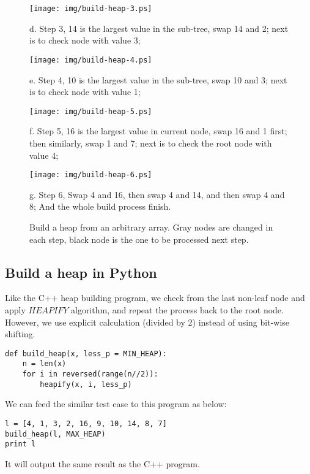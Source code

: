 \documentclass{article}
\begin{document}
\begin{figure}[htbp]
  \begin{center}
    \texttt{[image: img/build-heap-3.ps]}

    d. Step 3, 14 is the largest value in the sub-tree, swap 14 and 2; next is to check
node with value 3;

    \texttt{[image: img/build-heap-4.ps]}

    e. Step 4, 10 is the largest value in the sub-tree, swap 10 and 3; next is to check
node with value 1;

    \texttt{[image: img/build-heap-5.ps]}

    f. Step 5, 16 is the largest value in current node, swap 16 and 1 first; then
similarly, swap 1 and 7; next is to check the root node with value 4;

    \texttt{[image: img/build-heap-6.ps]}

    g. Step 6, Swap 4 and 16, then swap 4 and 14, and then swap 4 and 8; 
And the whole build process finish.

    \caption{Build a heap from an arbitrary array. Gray nodes are changed in each step,
black node is the one to be processed next step.} \label{fig:build-heap-2}
  \end{center}
\end{figure}


\subsection*{Build a heap in Python}

Like the C++ heap building program, we check from the last non-leaf
node and apply $HEAPIFY$ algorithm, and repeat the process back to
the root node. However, we use explicit calculation (divided by 2)
instead of using bit-wise shifting.

\lstset{language=Python}
\begin{lstlisting}
def build_heap(x, less_p = MIN_HEAP):
    n = len(x)
    for i in reversed(range(n//2)):
        heapify(x, i, less_p)
\end{lstlisting}

We can feed the similar test case to this program as below:

\begin{lstlisting}
l = [4, 1, 3, 2, 16, 9, 10, 14, 8, 7]
build_heap(l, MAX_HEAP)
print l
\end{lstlisting}

It will output the same result as the C++ program.
\end{document}
